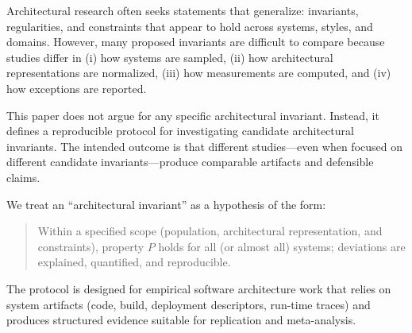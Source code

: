 Architectural research often seeks statements that generalize: invariants, regularities, and constraints that appear to hold across systems, styles, and domains. However, many proposed invariants are difficult to compare because studies differ in (i) how systems are sampled, (ii) how architectural representations are normalized, (iii) how measurements are computed, and (iv) how exceptions are reported.

This paper does not argue for any specific architectural invariant. Instead, it defines a reproducible protocol for investigating candidate architectural invariants. The intended outcome is that different studies---even when focused on different candidate invariants---produce comparable artifacts and defensible claims.

We treat an ``architectural invariant'' as a hypothesis of the form:

\begin{quote}
Within a specified scope (population, architectural representation, and constraints), property $P$ holds for all (or almost all) systems; deviations are explained, quantified, and reproducible.
\end{quote}

The protocol is designed for empirical software architecture work that relies on system artifacts (code, build, deployment descriptors, run-time traces) and produces structured evidence suitable for replication and meta-analysis.